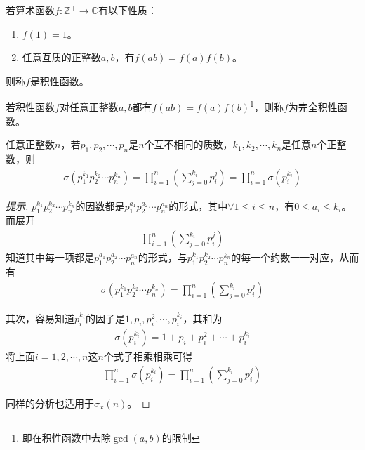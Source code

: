 \begin{definition}
  若算术函数$f:\mathbb{Z^+}\to \mathbb{C}$有以下性质：
  \begin{enumerate}
  \item $f(1) = 1$。
  \item 任意互质的正整数$a,b$，有$f(ab) = f(a)f(b)$。
  \end{enumerate}
  则称$f$是积性函数。
\end{definition}

\begin{definition}[完全积性函数]
  若积性函数$f$对任意正整数$a,b$都有$f(ab)=f(a)f(b)$\footnote{即在积性函数中去除$\gcd(a,b)$的限制}，则称$f$为完全积性函数。
\end{definition}

\begin{lemma}\label{lem:sigma(a^k1*b^k2)=sigma(a^k1)sigma(b^k2)}
  任意正整数$n$，若$p_1,p_2,\cdots,p_n$是$n$个互不相同的质数，$k_1, k_2,\cdots,k_n$是任意$n$个正整数，则
  \begin{align*}
    \sigma\left(p_1^{k_1} p_2^{k_2} \cdots p_n^{k_n}\right) = \prod_{i=1}^n \left(\sum_{j=0}^{k_i} p_i^j\right) 
    = \prod_{i=1}^n \sigma\left(p_i^{k_i}\right)
  \end{align*}
\end{lemma}
\begin{proof}[提示]
  $p_1^{k_1} p_2^{k_2}\cdots p_n^{k_n}$的因数都是$p_1^{a_1} p_2^{a_2}\cdots p_n^{a_n}$的形式，其中$\forall 1\le i\le n$，有$0\le a_i\le k_i$。而展开
  \begin{align*}
    \prod_{i=1}^n \left(\sum_{j=0}^{k_i} p_i^j\right)
  \end{align*}
  知道其中每一项都是$p_1^{a_1} p_2^{a_2}\cdots p_n^{a_n}$的形式，与$p_1^{k_1} p_2^{k_2}\cdots p_n^{k_n}$的每一个约数一一对应，从而有
  \begin{align*}
    \sigma\left(p_1^{k_1} p_2^{k_2} \cdots p_n^{k_n}\right) = \prod_{i=1}^n \left(\sum_{j=0}^{k_i} p_i^j\right) 
  \end{align*}


  其次，容易知道$p_i^{k_i}$的因子是$1,p_i, p_i^2,\cdots, p_i^{k_i}$，其和为
  \begin{align*}
    \sigma\left(p_i^{k_i}\right) = 1 + p_i + p_i^2 + \cdots + p_i^{k_i}
  \end{align*}
  将上面$i=1,2,\cdots,n$这$n$个式子相乘相乘可得
  \begin{align*}
    \prod_{i=1}^n \sigma\left(p_i^{k_i}\right) = \prod_{i=1}^n \left(\sum_{j=0}^{k_i} p_i^j\right)
  \end{align*}

  同样的分析也适用于$\sigma_x(n)$。
\end{proof}

